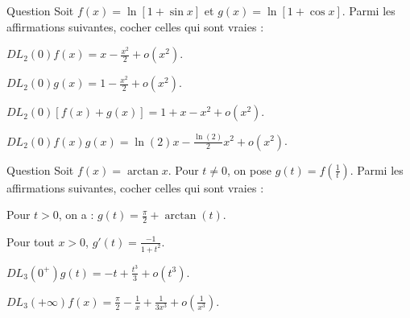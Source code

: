 \begin{multi}[multiple,feedback=
{Le \(\displaystyle DL_2(0)\ln (1+t)=t-\frac{t^2}{2}+o(t^2)\) avec \(\displaystyle t=\sin x=x+o(x^2)\) donne :
\[DL_2(0)f(x)=x-\frac{x^2}{2}+o(x^2.\]
Ensuite, on transforme \(g(x)\) : \(\displaystyle g(x)=\ln \left[2\left(1+\frac{\cos x-1}{2}\right)\right]=\ln (2)+\ln \left(1+\frac{\cos x-1}{2}\right)\). Ainsi, avec \(\displaystyle t=\frac{\cos x-1}{2}=-\frac{x^2}{4}+o(x^2)\), on obtient : \(\displaystyle g(x)=\ln (2)-\frac{x^2}{4}+o(x^2)\).
}]{Question}
Soit \(\displaystyle f(x)=\ln \left[1+\sin x\right]\) et \(\displaystyle g(x)=\ln \left[1+\cos x\right]\). Parmi les affirmations suivantes, cocher celles qui sont vraies :

    \item* \(\displaystyle DL_2(0)f(x)=x-\frac{x^2}{2}+o(x^2)\).
    \item \(\displaystyle DL_2(0)g(x)=1-\frac{x^2}{2}+o(x^2)\).
    \item \(\displaystyle DL_2(0)\left[f(x)+g(x)\right]=1+x-x^2+o(x^2)\).
    \item* \(\displaystyle DL_2(0)f(x)g(x)=\ln (2)x-\frac{\ln (2)}{2}x^2+o(x^2)\).
\end{multi}


\begin{multi}[multiple,feedback=
{Pour \(t>0\), on a : \(\displaystyle g(t)=\arctan \left(\frac{1}{t}\right)=\frac{\pi}{2}-\arctan (t)\). Donc
\[\displaystyle g'(t)=-\frac{1}{1+t^2}=-1+t^2+o(t^2)\]
et, par intégration, \(\displaystyle DL_3(0^+)g(t)=\frac{\pi}{2}-t+\frac{t^3}{3}+o(t^3)\) car \(\arctan 0=0\). Ainsi
\[\displaystyle DL_3(+\infty)f(x)=\frac{\pi}{2}-\frac{1}{x}+\frac{1}{3x^3}+o\left(\frac{1}{x^3}\right).\]
}]{Question}
Soit \(\displaystyle f(x)=\arctan x\). Pour \(t\neq 0\), on pose \(\displaystyle g(t)=f\left(\frac{1}{t}\right)\). Parmi les affirmations suivantes, cocher celles qui sont vraies :

    \item Pour \(t>0\), on a : \(\displaystyle g(t)=\frac{\pi}{2}+\arctan (t)\).
    \item* Pour tout \(x>0\), \(\displaystyle g'(t)=\frac{-1}{1+t^2}\).
    \item \(\displaystyle DL_3(0^+)g(t)=-t+\frac{t^3}{3}+o(t^3)\).
    \item* \(\displaystyle DL_3(+\infty)f(x)=\frac{\pi}{2}-\frac{1}{x}+\frac{1}{3x^3}+o\left(\frac{1}{x^3}\right)\).
\end{multi}


